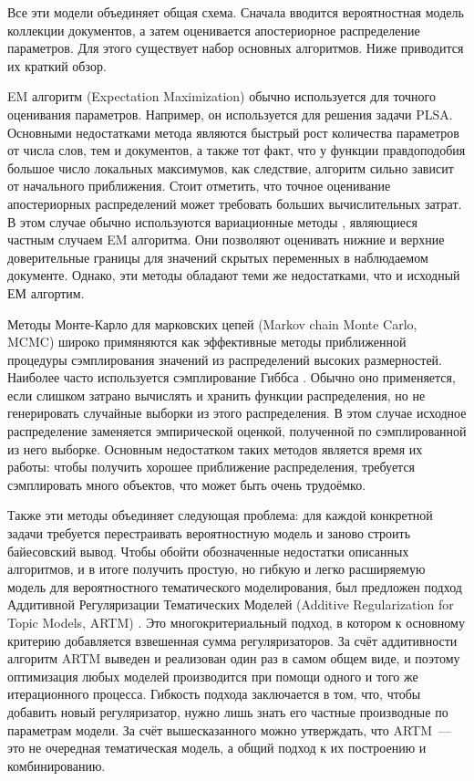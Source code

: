 \documentclass[12pt, twoside]{article}
\begin{document}
Все эти модели объединяет общая схема. Сначала вводится вероятностная модель коллекции документов, а затем оценивается  апостериорное распределение  параметров. Для этого существует набор основных алгоритмов. Ниже приводится их краткий обзор.

EM алгоритм (Expectation Maximization) \cite{bilmes1998gentle} обычно используется для  точного оценивания параметров. Например, он используется для решения задачи PLSA. Основными недостатками метода являются быстрый рост количества параметров от числа слов, тем и документов, а также тот факт, что у функции правдоподобия большое число локальных максимумов, как следствие, алгоритм сильно зависит от начального приближения. Стоит отметить, что точное оценивание апостериорных распределений может требовать больших вычислительных затрат. В этом случае обычно используются вариационные методы \cite{jordan1999introduction}, являющиеся частным случаем EM алгоритма. Они  позволяют оценивать нижние и верхние доверительные границы для значений скрытых переменных в наблюдаемом документе. Однако, эти методы обладают теми же недостатками, что и исходный ЕМ алгортим.

Методы Монте-Карло для марковских цепей (Markov chain Monte Carlo, MCMC) \cite{gilks1996introducing,andrieu2003introduction} широко примяняются как эффективные методы приближенной процедуры сэмплирования значений из распределений высоких размерностей. Наиболее часто используется сэмплирование Гиббса \cite{griffiths2004finding}.  Обычно оно применяется, если слишком затрано вычислять и хранить функции распределения,  но не генерировать случайные выборки из этого распределения. В этом случае исходное распределение заменяется эмпирической оценкой, полученной по  сэмплированной из него выборке. Основным недостатком таких методов является время их работы: чтобы получить хорошее приближение распределения, требуется сэмплировать много объектов, что может быть очень трудоёмко. 

Также эти методы объединяет следующая проблема:  для каждой конкретной задачи требуется перестраивать вероятностную модель и заново строить байесовский вывод. Чтобы обойти обозначенные недостатки описанных алгоритмов, и в итоге получить простую, но гибкую и легко расширяемую модель для вероятностного тематического моделирования, был предложен подход Аддитивной Регуляризации Тематических Моделей (Additive Regularization for Topic Models, ARTM) \cite{vorontsov2014additive,vorontsov2014tutorial,vorontsov2015additive}. Это многокритериальный подход, в котором к основному критерию добавляется взвешенная сумма регуляризаторов. За счёт аддитивности алгоритм ARTM  выведен и реализован один раз в самом общем виде, и поэтому оптимизация любых моделей  производится при помощи одного и того же итерационного процесса. Гибкость подхода заключается в том, что, чтобы добавить новый регуляризатор, нужно лишь знать его частные производные по параметрам модели. За счёт вышесказанного можно утверждать, что ARTM~---  это не очередная тематическая модель, а общий подход к их  построению и комбинированию. 
\end{document}
